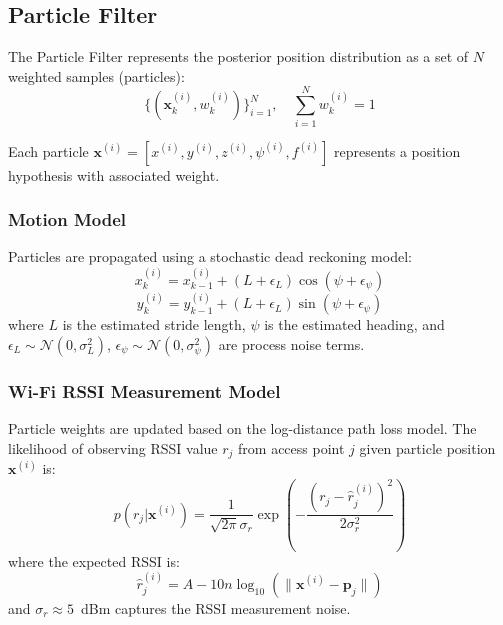 \documentclass[journal,twocolumn]{IEEEtran}
\begin{document}
\subsection{Particle Filter}

The Particle Filter represents the posterior position distribution as a set of $N$ weighted samples (particles):
\begin{equation}
    \{(\mathbf{x}_k^{(i)}, w_k^{(i)})\}_{i=1}^{N}, \quad \sum_{i=1}^N w_k^{(i)} = 1
    \label{eq:particles}
\end{equation}

Each particle $\mathbf{x}^{(i)} = [x^{(i)}, y^{(i)}, z^{(i)}, \psi^{(i)}, f^{(i)}]$ represents a position hypothesis with associated weight.

\subsubsection{Motion Model}
Particles are propagated using a stochastic dead reckoning model:
\begin{equation}
    x_k^{(i)} = x_{k-1}^{(i)} + (L + \epsilon_L) \cos(\psi + \epsilon_\psi)
    \label{eq:pf_motion_x}
\end{equation}
\begin{equation}
    y_k^{(i)} = y_{k-1}^{(i)} + (L + \epsilon_L) \sin(\psi + \epsilon_\psi)
    \label{eq:pf_motion_y}
\end{equation}
where $L$ is the estimated stride length, $\psi$ is the estimated heading, and $\epsilon_L \sim \mathcal{N}(0, \sigma_L^2)$, $\epsilon_\psi \sim \mathcal{N}(0, \sigma_\psi^2)$ are process noise terms.

\subsubsection{Wi-Fi RSSI Measurement Model}
Particle weights are updated based on the log-distance path loss model. The likelihood of observing RSSI value $r_j$ from access point $j$ given particle position $\mathbf{x}^{(i)}$ is:
\begin{equation}
    p(r_j | \mathbf{x}^{(i)}) = \frac{1}{\sqrt{2\pi}\sigma_r} \exp\left(-\frac{(r_j - \hat{r}_j^{(i)})^2}{2\sigma_r^2}\right)
    \label{eq:rssi_likelihood}
\end{equation}
where the expected RSSI is:
\begin{equation}
    \hat{r}_j^{(i)} = A - 10n\log_{10}\left(\|\mathbf{x}^{(i)} - \mathbf{p}_j\|\right)
    \label{eq:expected_rssi}
\end{equation}
and $\sigma_r \approx 5$~dBm captures the RSSI measurement noise.
\end{document}
